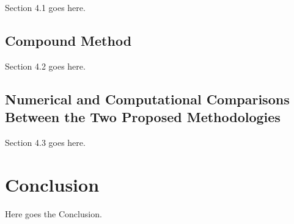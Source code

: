 \documentclass[journal,article,submit,pdftex,moreauthors]{Definitions/mdpi}
\begin{document}
Section 4.1 goes here.

\subsection{Compound Method}

Section 4.2 goes here.

\subsection{Numerical and Computational Comparisons Between the Two Proposed Methodologies}

Section 4.3 goes here.

\section{Conclusion}

Here goes the Conclusion.



\vspace{6pt} 



\end{document}
